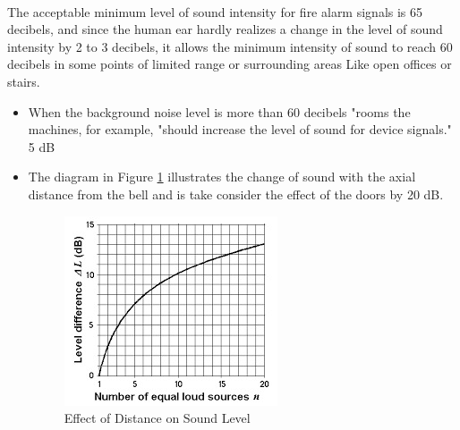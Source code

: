 \documentclass[12pt,fleqn]{book} %
\begin{document}
\begin{enumerate}
\\ The acceptable minimum level of sound intensity for fire alarm signals is 65 decibels, and since the human ear hardly realizes a change in the level of sound intensity by 2 to 3 decibels, it allows the minimum intensity of sound to reach 60 decibels in some points of limited range or surrounding areas Like open offices or stairs.
\begin{itemize}
    \item When the background noise level is more than 60 decibels "rooms the machines, for example, "should increase the level of sound for device signals." 5 dB
    \item The  diagram in Figure \ref{fig:hamdy 39} illustrates the change of sound with the axial distance from the bell and is take consider the effect of the doors by 20 dB.
    \begin{figure}[!h]
    \centering
    \includegraphics[width=0.5\linewidth]{hamdy 39.png}
    \caption{Effect of Distance on Sound Level}
    \label{fig:hamdy 39}
\end{figure}
\end{itemize}
\end{enumerate}
\end{document}
